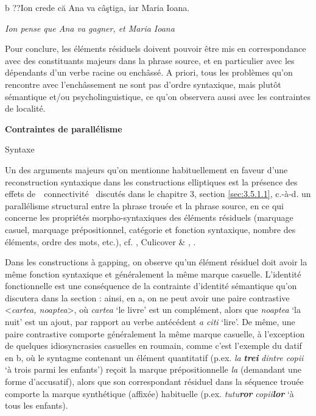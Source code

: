  b  ??Ion crede că Ana va câştiga, iar Maria Ioana.

    \textit{Ion pense que Ana va gagner, et Maria Ioana} 

Pour conclure, les éléments résiduels doivent pouvoir être mis en correspondance avec des constituants majeurs dans la phrase source, et en particulier avec les dépendants d'un verbe racine ou enchâssé. A priori, tous les problèmes qu'on rencontre avec l'enchâssement ne sont pas d'ordre syntaxique, mais plutôt sémantique et/ou psycholinguistique, ce qu'on observera aussi avec les contraintes de localité.

{\bfseries
\label{bkm:Ref289439628}Contraintes de parallélisme}

\label{bkm:Ref289631781}Syntaxe

Un des arguments majeurs qu'on mentionne habituellement en faveur d'une reconstruction syntaxique dans les constructions elliptiques est la présence des effets de~{\guillemotleft}~connectivité~{\guillemotright} discutés dans le chapitre 3, section \ref{sec:3.5.1.1}, c.-à-d. un parallélisme structural entre la phrase trouée et la phrase source, en ce qui concerne les propriétés morpho-syntaxiques des éléments résiduels (marquage casuel, marquage prépositionnel, catégorie et fonction syntaxique, nombre des éléments, ordre des mots, etc.), cf. \citet{Hartmann2000}, Culicover \& \citet{Jackendoff2005}, \citet{Culicover2009}.

Dans les constructions à gapping, on observe qu'un élément résiduel doit avoir la même fonction syntaxique et généralement la même marque casuelle. L'identité fonctionnelle est une conséquence de la contrainte d'identité sémantique qu'on discutera dans la section  : ainsi, en a, on ne peut avoir une paire contrastive {\textless}\textit{cartea, noaptea}{\textgreater}, où \textit{cartea} `le livre' est un complément, alors que \textit{noaptea} `la nuit' est un ajout, par rapport au verbe antécédent \textit{a citi} `lire'. De même, une paire contrastive comporte généralement la même marque casuelle, à l'exception de quelques idiosyncrasies casuelles en roumain, comme c'est l'exemple du datif en b, où le syntagme contenant un élément quantitatif (p.ex. \textit{la} \textbf{\textit{trei} }\textit{dintre copii} `à trois parmi les enfants') reçoit la marque prépositionnelle \textit{la} (demandant une forme d'accusatif), alors que son correspondant résiduel dans la séquence trouée comporte la marque synthétique (affixée) habituelle (p.ex. \textit{tutu}\textbf{\textit{ror}}\textit{ copii}\textbf{\textit{lor}}\textbf{} `à tous les enfants).  


